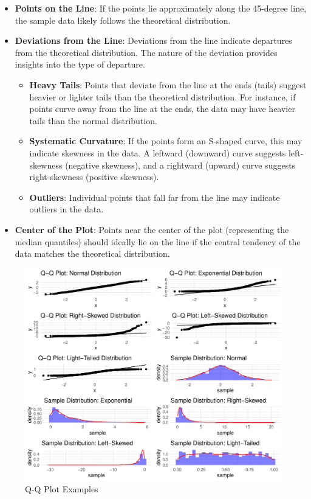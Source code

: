 \begin{itemize}
    \item \textbf{Points on the Line}: If the points lie approximately along the 45-degree line, the sample data likely follows the theoretical distribution.
    \item \textbf{Deviations from the Line}: Deviations from the line indicate departures from the theoretical distribution. The nature of the deviation provides insights into the type of departure.
        \begin{itemize}
            \item \textbf{Heavy Tails}: Points that deviate from the line at the ends (tails) suggest heavier or lighter tails than the theoretical distribution. For instance, if points curve away from the line at the ends, the data may have heavier tails than the normal distribution.
            \item \textbf{Systematic Curvature}: If the points form an S-shaped curve, this may indicate skewness in the data. A leftward (downward) curve suggests left-skewness (negative skewness), and a rightward (upward) curve suggests right-skewness (positive skewness).
            \item \textbf{Outliers}: Individual points that fall far from the line may indicate outliers in the data.
        \end{itemize}
    \item \textbf{Center of the Plot}: Points near the center of the plot (representing the median quantiles) should ideally lie on the line if the central tendency of the data matches the theoretical distribution.
\end{itemize}

\begin{figure}[H]
    \centering
    \includegraphics[width=1\textwidth]{plots/Q-QExample.pdf}
    \caption{Q-Q Plot Examples}
\end{figure}